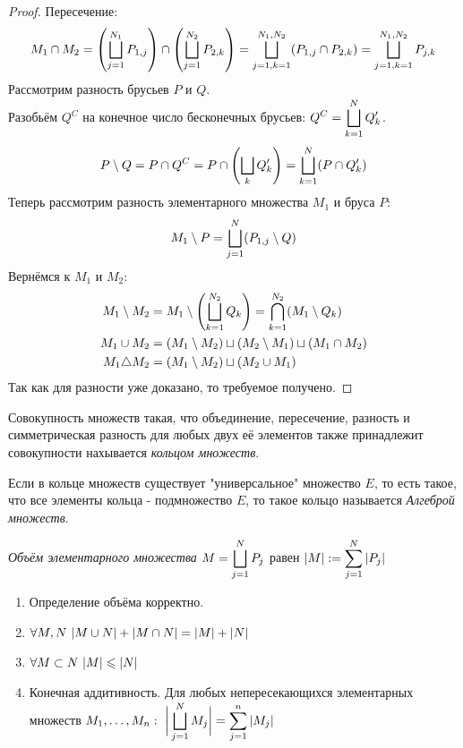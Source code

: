 \begin{proof}
	Пересечение:
	\[M_1\cap M_2=\left(\bigsqcup_{j=1}^{N_1}P_{1,j}\right)\cap\left(\bigsqcup_{j=1}^{N_2}P_{2,k}\right)=\bigsqcup_{j=1,k=1}^{N_1,N_2}(P_{1,j}\cap P_{2,k})=\bigsqcup_{j=1,k=1}^{N_1,N_2}P_{j,k}\]
	Рассмотрим разность брусьев $P$ и $Q$.\\
	Разобьём $Q^C$ на конечное число бесконечных брусьев: $\displaystyle Q^C=\bigsqcup_{k=1}^NQ_k'$.
	\[P\setminus Q=P\cap Q^C=P\cap\left(\bigsqcup_{k}Q_k'\right)=\bigsqcup_{k=1}^N(P\cap Q_k')\]
	Теперь рассмотрим разность элементарного множества $M_1$ и бруса $P$:
	\[M_1\setminus P=\bigsqcup_{j=1}^N(P_{1,j}\setminus Q)\]
	Вернёмся к $M_1$ и $M_2$:
	\begin{equation*}
		\begin{split}
			M_1\setminus M_2&=M_1\setminus\left(\bigsqcup_{k=1}^{N_2}Q_k\right)=\bigcap_{k=1}^{N_2}(M_1\setminus Q_k)\\
			M_1\cup M_2&=(M_1\setminus M_2)\sqcup(M_2\setminus M_1)\sqcup(M_1\cap M_2)\\
			M_1\triangle M_2&=(M_1\setminus M_2)\sqcup(M_2\cup M_1)
		\end{split}
	\end{equation*}
	Так как для разности уже доказано, то требуемое получено.
\end{proof}
\begin{definition}
	Совокупность множеств такая, что объединение, пересечение, разность и симметрическая разность для любых двух её элементов также принадлежит совокупности нахывается \textit{кольцом множеств}.
\end{definition}
\begin{definition}
	Если в кольце множеств существует "универсальное" множество $E$, то есть такое, что все элементы кольца - подмножество $E$, то такое кольцо называется \textit{Алгеброй множеств}.
\end{definition}
\begin{definition}
	\textit{Объём элементарного множества} $\displaystyle M=\bigsqcup_{j=1}^NP_j$ равен $\ds|M|:=\sum_{j=1}^N|P_j|$
\end{definition}
\begin{theorem}\label{19_th1}
	\begin{enumerate}
		\item Определение объёма корректно.
		\item $\forall M,N\ |M\cup N|+|M\cap N|=|M|+|N|$
		\item $\fa M\subset N\ |M|\le|N|$
		\item Конечная аддитивность. Для любых непересекающихся элементарных множеств $\ds M_1,\dots,M_n:\ \bigg|\bsc_{j=1}^NM_j\bigg|=\sum_{j=1}^n|M_j|$
	\end{enumerate}
\end{theorem}
